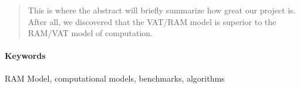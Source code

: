 \begin{abstract}
  This is where the abstract will briefly summarize how great our project is.
  After all, we discovered that the VAT/RAM model is superior to the RAM/VAT
  model of computation.
\end{abstract}

\paragraph{Keywords} RAM Model, computational models, benchmarks, algorithms
